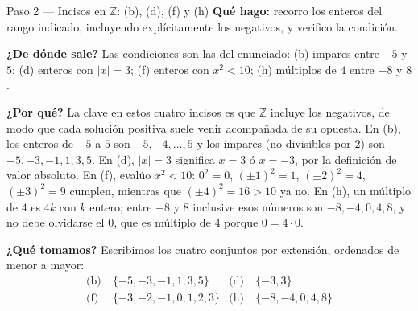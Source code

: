 \documentclass[11pt]{article}
\begin{document}
\begin{paso}{Paso 2 --- Incisos en $\mathbb{Z}$: (b), (d), (f) y (h)}
\textbf{Qué hago:} recorro los enteros del rango indicado, incluyendo explícitamente los
negativos, y verifico la condición.

\textbf{¿De dónde sale?} Las condiciones son las del enunciado: (b) impares entre $-5$ y $5$;
(d) enteros con $|x|=3$; (f) enteros con $x^{2}<10$; (h) múltiplos de $4$ entre $-8$ y $8$.

\textbf{¿Por qué?} La clave en estos cuatro incisos es que $\mathbb{Z}$ incluye los negativos,
de modo que cada solución positiva suele venir acompañada de su opuesta. En (b), los enteros
de $-5$ a $5$ son $-5,-4,\dots,5$ y los impares (no divisibles por $2$) son
$-5,-3,-1,1,3,5$. En (d), $|x|=3$ significa $x=3$ ó $x=-3$, por la definición de valor
absoluto. En (f), evalúo $x^{2}<10$: $0^{2}=0$, $(\pm1)^{2}=1$, $(\pm2)^{2}=4$,
$(\pm3)^{2}=9$ cumplen, mientras que $(\pm4)^{2}=16>10$ ya no. En (h), un múltiplo de $4$ es
$4k$ con $k$ entero; entre $-8$ y $8$ inclusive esos números son $-8,-4,0,4,8$, y no debe
olvidarse el $0$, que es múltiplo de $4$ porque $0=4\cdot 0$.

\textbf{¿Qué tomamos?} Escribimos los cuatro conjuntos por extensión, ordenados de menor a
mayor:
\begin{align*}
	\text{(b)}\ & \{-5,-3,-1,1,3,5\} & \text{(d)}\ & \{-3,3\}\\
	\text{(f)}\ & \{-3,-2,-1,0,1,2,3\} & \text{(h)}\ & \{-8,-4,0,4,8\}
\end{align*}
\end{paso}
\end{document}
